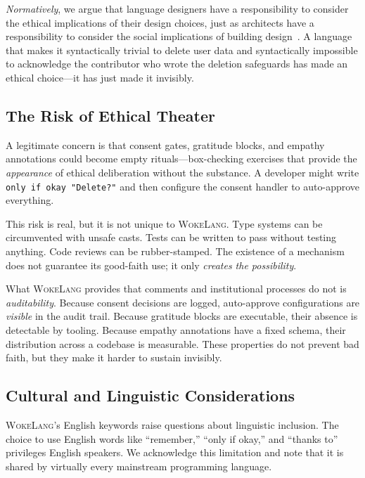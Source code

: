 \documentclass[11pt,a4paper]{article}
\newcommand{\WokeLang}{\textsc{WokeLang}}
\begin{document}
\emph{Normatively}, we argue that language designers have a
responsibility to consider the ethical implications of their design
choices, just as architects have a responsibility to consider the
social implications of building
design~\citep{winner1980artifacts,flanagan2005values}.  A language
that makes it syntactically trivial to delete user data and
syntactically impossible to acknowledge the contributor who wrote the
deletion safeguards has made an ethical choice---it has just made it
invisibly.

\subsection{The Risk of Ethical Theater}

A legitimate concern is that consent gates, gratitude blocks, and
empathy annotations could become empty rituals---box-checking
exercises that provide the \emph{appearance} of ethical deliberation
without the substance.  A developer might write \texttt{only if okay
"Delete?"} and then configure the consent handler to auto-approve
everything.

This risk is real, but it is not unique to \WokeLang{}.  Type systems
can be circumvented with unsafe casts.  Tests can be written to pass
without testing anything.  Code reviews can be rubber-stamped.  The
existence of a mechanism does not guarantee its good-faith use; it
only \emph{creates the possibility}.

What \WokeLang{} provides that comments and institutional processes do
not is \emph{auditability}.  Because consent decisions are logged,
auto-approve configurations are \emph{visible} in the audit trail.
Because gratitude blocks are executable, their absence is detectable
by tooling.  Because empathy annotations have a fixed schema, their
distribution across a codebase is measurable.  These properties do not
prevent bad faith, but they make it harder to sustain invisibly.

\subsection{Cultural and Linguistic Considerations}

\WokeLang{}'s English keywords raise questions about linguistic
inclusion.  The choice to use English words like ``remember,'' ``only
if okay,'' and ``thanks to'' privileges English speakers.  We
acknowledge this limitation and note that it is shared by virtually
every mainstream programming language.
\end{document}
